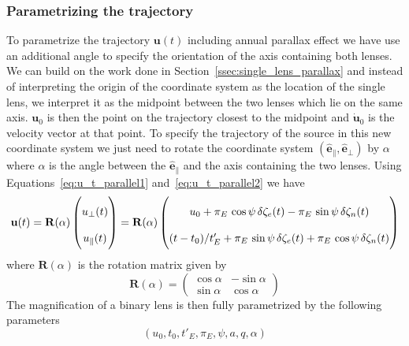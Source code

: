 \documentclass[12pt,dvipsnames]{report}
\begin{document}
\subsubsection{Parametrizing the trajectory}
To parametrize the trajectory $\mathbf u(t)$ including annual parallax effect
we have use an additional angle to specify the orientation of the axis
containing both lenses. We can build on the work done in
Section~\ref{ssec:single_lens_parallax} and instead of interpreting the origin
of the coordinate system as the location of the single lens, we interpret it as
the midpoint between the two lenses which lie on the same axis. $\mathbf u_0$
is then the point on the trajectory closest to the midpoint and $\dot{\mathbf
        u}_0$ is the velocity vector at that point. To specify the trajectory of the
source in this new coordinate system we just need to rotate the coordinate
system $(\hat{\mathbf e}_\parallel, \hat{\mathbf e}_\bot)$ by $\alpha$ where $\alpha$ is the angle between
the $\hat{\mathbf e}_\parallel$ and the axis containing the two lenses. Using
Equations~\ref{eq:u_t_parallel1} and~\ref{eq:u_t_parallel2} we have
\begin{equation}
    \mathbf u(t)  =
    \mathbf R(\alpha)
    \begin{pmatrix}
        u_\bot (t) \\
        u_\parallel (t)
    \end{pmatrix}
    =
    \mathbf R(\alpha)
    \renewcommand\arraystretch{2}
    \begin{pmatrix}
        u_0 + \pi_E\,\cos\psi\,\delta \zeta_e(t) - \pi_E\,\sin\psi\,\delta \zeta_n(t) \\
        (t-t_0)/t_E' + \pi_E\,\sin\psi\,\delta \zeta_e(t) +
        \pi_E\,\cos\psi\,\delta \zeta_n(t)
    \end{pmatrix}
\end{equation}
where $\mathbf R (\alpha)$ is the rotation matrix  given by
\begin{equation}
    \mathbf R (\alpha)=
    \begin{pmatrix}
        \cos\alpha & -\sin\alpha \\
        \sin\alpha & \cos\alpha
    \end{pmatrix}
\end{equation}
The magnification of a binary lens is then fully parametrized by the following parameters
\begin{equation}
    (u_0,t_0,t'_E,\pi_E,\psi, a, q, \alpha)
\end{equation}
\end{document}
